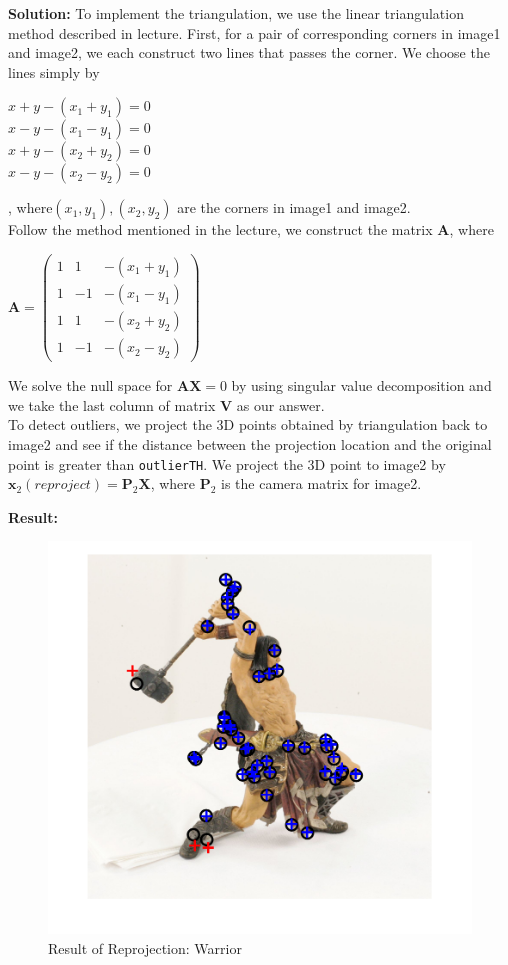 \documentclass{assignment}
\begin{document}
\begin{problemlist}
\textbf{Solution:}
To implement the triangulation, we use the linear triangulation method described in lecture. First, for a pair of corresponding corners in image1 and image2, we each construct two lines that passes the corner. We choose the lines simply by
\begin{center}
$x + y - (x_1 + y_1) = 0$\\
$x - y - (x_1 - y_1) = 0$\\
$x + y - (x_2 + y_2) = 0$\\
$x - y - (x_2 - y_2) = 0$
\end{center}
, where$(x_1, y_1), (x_2, y_2)$ are the corners in image1 and image2.\\
Follow the method mentioned in the lecture, we construct the matrix \textbf{A}, where
\begin{center}
$\textbf{A} =
\left(
\begin{array}{clr}
1 &  1 & -(x_1 + y_1)\\
1 & -1 & -(x_1 - y_1)\\
1 &  1 & -(x_2 + y_2)\\
1 & -1 & -(x_2 - y_2)
\end{array}
\right)
$
\end{center}
We solve the null space for $\textbf{A}\textbf{X} = 0$ by using singular value decomposition and we take the last column of matrix \textbf{V} as our answer.\\
To detect outliers, we project the 3D points obtained by triangulation back to image2 and see if the distance between the projection  location and the original point is greater than \texttt{outlierTH}. We project the 3D point to image2 by $\textbf{x}_2(reproject) = \textbf{P}_2\textbf{X}$, where $\textbf{P}_2$ is the camera matrix for image2.

\newpage
\textbf{Result:}
\begin{figure}[!ht]
\centering
\includegraphics[scale = 0.6]{6_6warrior.png}
\caption{Result of Reprojection: Warrior}
\end{figure}


\end{problemlist}
\end{document}
